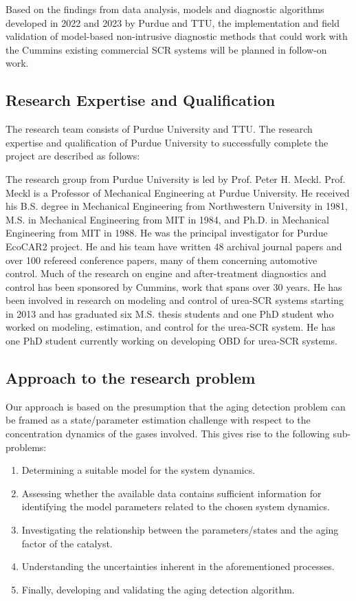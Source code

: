 Based on the findings from data analysis, models and diagnostic algorithms
developed in 2022 and 2023 by Purdue and TTU, the implementation and field
validation of model-based non-intrusive diagnostic methods that could work with
the Cummins existing commercial SCR systems will be planned in follow-on work.

\subsection{Research Expertise and Qualification}
The research team consists of Purdue University and TTU. The research expertise and qualification of Purdue University to successfully complete the project are described as follows:

The research group from Purdue University is led by Prof. Peter H. Meckl. Prof.
Meckl is a Professor of Mechanical Engineering at Purdue University. He
received his B.S. degree in Mechanical Engineering from Northwestern University
in 1981, M.S. in Mechanical Engineering from MIT in 1984, and Ph.D. in
Mechanical Engineering from MIT in 1988. He was the principal investigator for
Purdue EcoCAR2 project. He and his team have written 48 archival journal papers
and over 100 refereed conference papers, many of them concerning automotive
control. Much of the research on engine and after-treatment diagnostics and
control has been sponsored by Cummins, work that spans over 30 years. He has
been involved in research on modeling and control of urea-SCR systems starting
in 2013 and has graduated six M.S. thesis students and one PhD student who
worked on modeling, estimation, and control for the urea-SCR system. He has one
PhD student currently working on developing OBD for urea-SCR systems.


\subsection{Approach to the research problem}
Our approach is based on the presumption that the aging detection problem can be framed as a state/parameter estimation challenge with respect to the concentration dynamics of the gases involved. This gives rise to the following sub-problems:

\begin{enumerate}
\item Determining a suitable model for the system dynamics.
\item Assessing whether the available data contains sufficient information for identifying the model parameters related to the chosen system dynamics.
\item Investigating the relationship between the parameters/states and the aging
factor of the catalyst. 
\item Understanding the uncertainties inherent in the aforementioned processes.
\item Finally, developing and validating the aging detection algorithm.
\end{enumerate}
